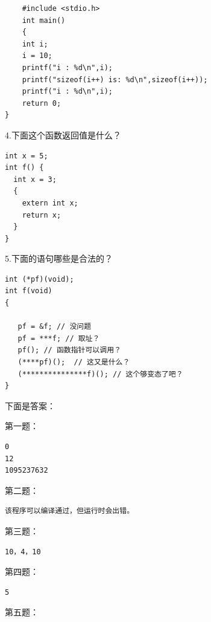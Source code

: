\documentclass[a4paper]{book}
\begin{document}
{\footnotesize\begin{shaded}\begin{verbatim}
    #include <stdio.h> 
    int main() 
    {
    int i;
    i = 10;
    printf("i : %d\n",i);
    printf("sizeof(i++) is: %d\n",sizeof(i++));
    printf("i : %d\n",i);
    return 0; 
}
\end{verbatim}\end{shaded}}
4.下面这个函数返回值是什么？

{\footnotesize\begin{shaded}\begin{verbatim}
int x = 5;
int f() {
  int x = 3;
  {
    extern int x;
    return x;
  }
}
\end{verbatim}\end{shaded}}
5.下面的语句哪些是合法的？

{\footnotesize\begin{shaded}\begin{verbatim}
int (*pf)(void);
int f(void)
{

   pf = &f; // 没问题
   pf = ***f; // 取址？
   pf(); // 函数指针可以调用？
   (****pf)();  // 这又是什么？
   (***************f)(); // 这个够变态了吧？
}
\end{verbatim}\end{shaded}}
下面是答案：

第一题：

{\footnotesize\begin{shaded}\begin{verbatim}
0
12
1095237632
\end{verbatim}\end{shaded}}
第二题：

{\footnotesize\begin{shaded}\begin{verbatim}
该程序可以编译通过，但运行时会出错。
\end{verbatim}\end{shaded}}
第三题：

{\footnotesize\begin{shaded}\begin{verbatim}
10，4，10
\end{verbatim}\end{shaded}}
第四题：

{\footnotesize\begin{shaded}\begin{verbatim}
5
\end{verbatim}\end{shaded}}
第五题：
\end{document}
